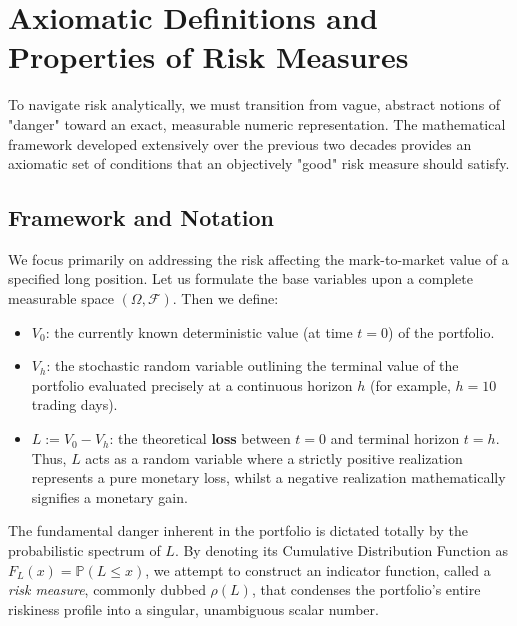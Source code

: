 \chapter{Axiomatic Definitions and Properties of Risk Measures}

To navigate risk analytically, we must transition from vague, abstract notions of "danger" toward an exact, measurable numeric representation. The mathematical framework developed extensively over the previous two decades provides an axiomatic set of conditions that an objectively "good" risk measure should satisfy. 

\section{Framework and Notation}

We focus primarily on addressing the risk affecting the mark-to-market value of a specified long position. Let us formulate the base variables upon a complete measurable space $(\Omega, \mathcal{F})$. Then we define:
\begin{itemize}
    \item $V_0$: the currently known deterministic value (at time $t=0$) of the portfolio.
    \item $V_h$: the stochastic random variable outlining the terminal value of the portfolio evaluated precisely at a continuous horizon $h$ (for example, $h = 10$ trading days).
    \item $L := V_0 - V_h$: the theoretical \textbf{loss} between $t=0$ and terminal horizon $t=h$. Thus, $L$ acts as a random variable where a strictly positive realization represents a pure monetary loss, whilst a negative realization mathematically signifies a monetary gain.
\end{itemize}

The fundamental danger inherent in the portfolio is dictated totally by the probabilistic spectrum of $L$.
By denoting its Cumulative Distribution Function as $F_L(x) = \mathbb{P}(L \leq x)$, we attempt to construct an indicator function, called a \textit{risk measure}, commonly dubbed $\rho(L)$, that condenses the portfolio's entire riskiness profile into a singular, unambiguous scalar number. 

